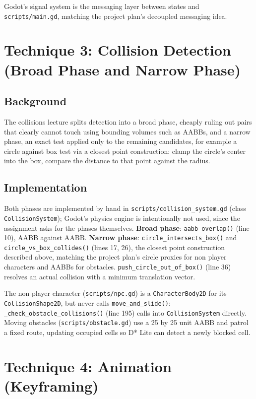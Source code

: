 \documentclass[11pt,a4paper]{article}
\begin{document}
Godot's signal system is the messaging layer between states and \texttt{scripts/main.gd}, matching the project plan's decoupled messaging idea.

\section{Technique 3: Collision Detection (Broad Phase and Narrow Phase)}

\subsection{Background}

The collisions lecture splits detection into a broad phase, cheaply ruling out pairs that clearly cannot touch using bounding volumes such as AABBs, and a narrow phase, an exact test applied only to the remaining candidates, for example a circle against box test via a closest point construction: clamp the circle's center into the box, compare the distance to that point against the radius.

\subsection{Implementation}

Both phases are implemented by hand in \texttt{scripts/collision\_system.gd} (class \texttt{CollisionSystem}); Godot's physics engine is intentionally not used, since the assignment asks for the phases themselves. \textbf{Broad phase}: \texttt{aabb\_overlap()} (line 10), AABB against AABB. \textbf{Narrow phase}: \texttt{circle\_intersects\_box()} and \texttt{circle\_vs\_box\_collides()} (lines 17, 26), the closest point construction described above, matching the project plan's circle proxies for non player characters and AABBs for obstacles. \texttt{push\_circle\_out\_of\_box()} (line 36) resolves an actual collision with a minimum translation vector.

The non player character (\texttt{scripts/npc.gd}) is a \texttt{CharacterBody2D} for its \texttt{CollisionShape2D}, but never calls \texttt{move\_and\_slide()}: \texttt{\_check\_obstacle\_collisions()} (line 195) calls into \texttt{CollisionSystem} directly. Moving obstacles (\texttt{scripts/obstacle.gd}) use a 25 by 25 unit AABB and patrol a fixed route, updating occupied cells so D* Lite can detect a newly blocked cell.

\section{Technique 4: Animation (Keyframing)}
\end{document}
